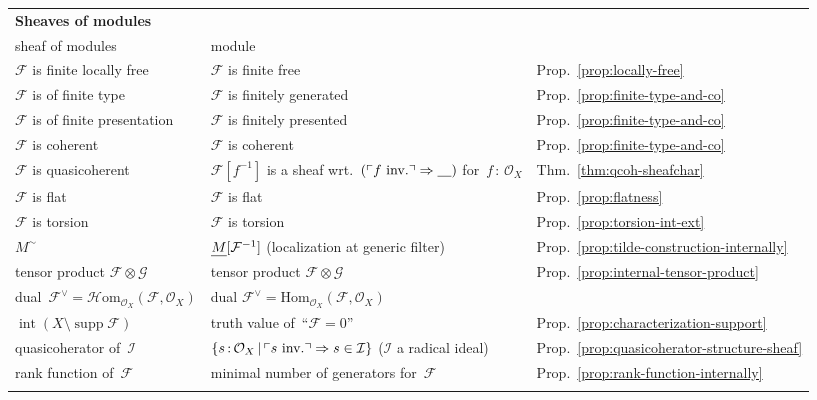 \documentclass[10pt,reqno,a4paper]{amsbook}
\makeatletter
\theoremstyle{definition}
\theoremstyle{plain}
\theoremstyle{remark}
\newcommand{\F}{\mathcal{F}}
\renewcommand{\G}{\mathcal{G}}
\renewcommand{\O}{\mathcal{O}}
\newcommand{\I}{\mathcal{I}}
\newcommand{\Hom}{\mathrm{Hom}}
\newcommand{\HOM}{\mathcal{H}\mathrm{om}}
\newcommand{\placeholder}{\underline{\quad}}
\let\oldul\ul
\renewcommand{\ul}[1]{\text{\oldul{$#1$}}}
\DeclareMathOperator{\Int}{int}
\DeclareMathOperator{\supp}{supp}
\newcommand{\?}{\,{:}\,}
\renewcommand{\_}{\mathpunct{.}\,}
\newcommand{\speak}[1]{\ulcorner\text{\textnormal{#1}}\urcorner}
\newcommand{\inv}{inv.\@}
\makeatother
\begin{document}
\begin{appendix}
{\begin{longtable}{@{}p{4.4cm}@{\qquad}p{6.7cm}@{\qquad}p{1.5cm}@{}}
  \textbf{Sheaves of modules} \\
  sheaf of modules & module \\
  $\F$ is finite locally free & $\F$ is finite free & Prop.\@~\ref{prop:locally-free} \\
  $\F$ is of finite type & $\F$ is finitely generated & Prop.\@~\ref{prop:finite-type-and-co} \\
  $\F$ is of finite presentation & $\F$ is finitely presented & Prop.\@~\ref{prop:finite-type-and-co} \\
  $\F$ is coherent & $\F$ is coherent & Prop.\@~\ref{prop:finite-type-and-co} \\
  $\F$ is quasicoherent & $\F[f^{-1}]$ is a sheaf wrt.\@~$(\speak{$f$ \inv} \Rightarrow \placeholder)$ for~$f\?\O_X$ & Thm.\@~\ref{thm:qcoh-sheafchar} \\
  $\F$ is flat & $\F$ is flat & Prop.\@~\ref{prop:flatness} \\
  $\F$ is torsion & $\F$ is torsion & Prop.\@~\ref{prop:torsion-int-ext} \\
  $M^\sim$ & $\ul{M}[\F^{-1}]$ (localization at generic filter) & Prop.\@~\ref{prop:tilde-construction-internally} \\
  tensor product $\F \otimes \G$ & tensor product $\F \otimes \G$ & Prop.\@~\ref{prop:internal-tensor-product} \\
  dual~$\F^\vee = \HOM_{\O_X}(\F,\O_X)$ & dual $\F^\vee = \Hom_{\O_X}(\F,\O_X)$ \\
  $\Int(X \setminus \supp\F)$ & truth value of~``$\F = 0$'' & Prop.\@~\ref{prop:characterization-support} \\
  quasicoherator of~$\I$ & $\{ s\?\O_X \,|\, \speak{$s$ \inv}
  \Rightarrow s \in \I \}$ ($\I$ a radical ideal) & Prop.\@~\ref{prop:quasicoherator-structure-sheaf} \\
  rank function of~$\F$ & minimal number of generators for~$\F$ & Prop.\@~\ref{prop:rank-function-internally} \\\\


\end{longtable}}
\end{appendix}
\end{document}
